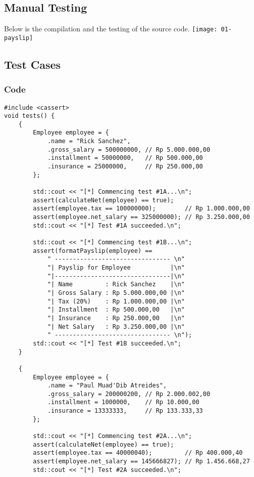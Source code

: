 \documentclass[12pt]{article}
\begin{document}
\subsection{Manual Testing}
Below is the compilation and the testing of the source code.
\newline\texttt{[image: 01-payslip]}

\subsection{Test Cases}
\subsubsection{Code}
\begin{verbatim}
#include <cassert>
void tests() {
    {
        Employee employee = {
            .name = "Rick Sanchez",
            .gross_salary = 500000000, // Rp 5.000.000,00
            .installment = 50000000,   // Rp 500.000,00
            .insurance = 25000000,     // Rp 250.000,00
        };

        std::cout << "[*] Commencing test #1A...\n";
        assert(calculateNet(employee) == true);
        assert(employee.tax == 100000000);        // Rp 1.000.000,00
        assert(employee.net_salary == 325000000); // Rp 3.250.000,00
        std::cout << "[*] Test #1A succeeded.\n";

        std::cout << "[*] Commencing test #1B...\n";
        assert(formatPayslip(employee) ==
            " -------------------------------- \n"
            "| Payslip for Employee           |\n"
            "|--------------------------------|\n"
            "| Name         : Rick Sanchez    |\n"
            "| Gross Salary : Rp 5.000.000,00 |\n"
            "| Tax (20%)    : Rp 1.000.000,00 |\n"
            "| Installment  : Rp 500.000,00   |\n"
            "| Insurance    : Rp 250.000,00   |\n"
            "| Net Salary   : Rp 3.250.000,00 |\n"
            " -------------------------------- \n");
        std::cout << "[*] Test #1B succeeded.\n";
    }

    {
        Employee employee = {
            .name = "Paul Muad'Dib Atreides",
            .gross_salary = 200000200, // Rp 2.000.002,00
            .installment = 1000000,    // Rp 10.000,00
            .insurance = 13333333,     // Rp 133.333,33
        };

        std::cout << "[*] Commencing test #2A...\n";
        assert(calculateNet(employee) == true);
        assert(employee.tax == 40000040);         // Rp 400.000,40
        assert(employee.net_salary == 145666827); // Rp 1.456.668,27
        std::cout << "[*] Test #2A succeeded.\n";


\end{verbatim}
\end{document}
